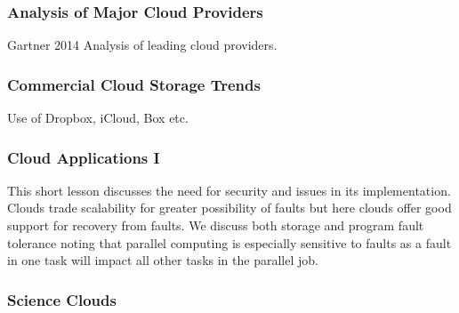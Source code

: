 

\subsubsection{Analysis of Major Cloud Providers}\label{analysis-of-major-cloud-providers}

Gartner 2014 Analysis of leading cloud providers.


\subsubsection{Commercial Cloud Storage Trends}\label{commercial-cloud-storage-trends}

Use of Dropbox, iCloud, Box etc.



\subsubsection{Cloud Applications I}\label{cloud-applications-i}

This short lesson discusses the need for security and issues in its
implementation. Clouds trade scalability for greater possibility of
faults but here clouds offer good support for recovery from faults. We
discuss both storage and program fault tolerance noting that parallel
computing is especially sensitive to faults as a fault in one task will
impact all other tasks in the parallel job.




\subsubsection{Science Clouds}\label{science-clouds}

